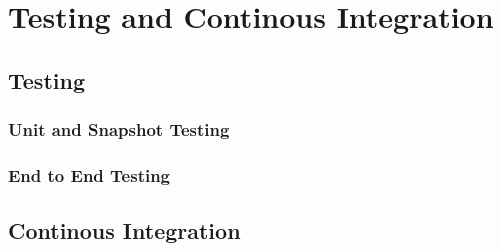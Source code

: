 \chapter{Testing and Continous Integration}

\section{Testing}

\subsection{Unit and Snapshot Testing}


\subsection{End to End Testing}


\section{Continous Integration}

